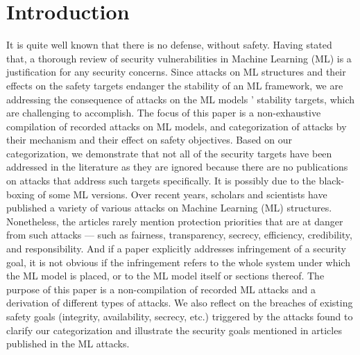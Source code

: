 \documentclass[journal,twoside,web]{ieeecolor}
\begin{document}
\section{Introduction}
\label{sec:introduction}
\IEEEPARstart It is quite well known that there is no defense, without safety. Having stated that, a thorough review of security vulnerabilities in Machine Learning (ML) is a justiﬁcation for any security concerns. Since attacks on ML structures and their eﬀects on the safety targets endanger the stability of an ML framework, we are addressing the consequence of attacks on the ML models ’ stability targets, which are challenging to accomplish. The focus of this paper is a non-exhaustive compilation of recorded attacks on ML models, and categorization of attacks by their mechanism and their eﬀect on safety objectives. Based on our categorization, we demonstrate that not all of the security targets have been addressed in the literature as they are ignored because there are no publications on attacks that address such targets speciﬁcally. It is possibly due to the black-boxing of some ML versions. Over recent years, scholars and scientists have published a variety of various attacks on Machine Learning (ML) structures. Nonetheless, the articles rarely mention protection priorities that are at danger from such attacks — such as fairness, transparency, secrecy, eﬃciency, credibility, and responsibility. And if a paper explicitly addresses infringement of a security goal, it is not obvious if the infringement refers to the whole system under which the ML model is placed, or to the ML model itself or sections thereof. The purpose of this paper is a non-compilation of recorded ML attacks and a derivation of diﬀerent types of attacks. We also reﬂect on the breaches of existing safety goals (integrity, availability, secrecy, etc.) triggered by the attacks found to clarify our categorization and illustrate the security goals mentioned in articles published in the ML attacks.
\end{document}
